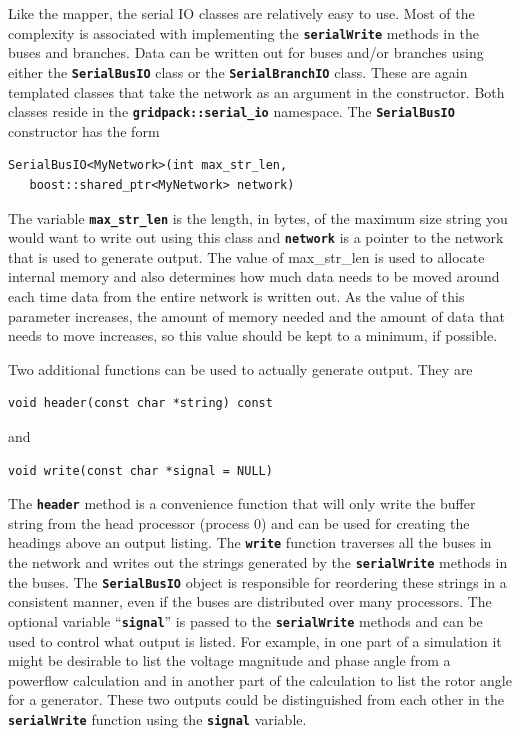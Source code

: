 Like the mapper, the serial IO classes are relatively easy to use. Most of the complexity is associated with implementing the \texttt{\textbf{serialWrite}} methods in the buses and branches. Data can be written out for buses and/or branches using either the \texttt{\textbf{SerialBusIO}} class or the \texttt{\textbf{SerialBranchIO}} class. These are again templated classes that take the network as an argument in the constructor. Both classes reside in the \texttt{\textbf{gridpack::serial\_io}} namespace. The \texttt{\textbf{SerialBusIO}} constructor has the form

{
\color{red}
\begin{Verbatim}[fontseries=b]
SerialBusIO<MyNetwork>(int max_str_len,
   boost::shared_ptr<MyNetwork> network)
\end{Verbatim}
}

The variable \texttt{\textbf{max\_str\_len}} is the length, in bytes, of the maximum size string you would want to write out using this class and \texttt{\textbf{network}} is a pointer to the network that is used to generate output. The value of max\_str\_len is used to allocate internal memory and also determines how much data needs to be moved around each time data from the entire network is written out. As the value of this parameter increases, the amount of memory needed and the amount of data that needs to move increases, so this value should be kept to a minimum, if possible. 

Two additional functions can be used to actually generate output. They are

{
\color{red}
\begin{Verbatim}[fontseries=b]
void header(const char *string) const
\end{Verbatim}
}

and 

{
\color{red}
\begin{Verbatim}[fontseries=b]
void write(const char *signal = NULL)
\end{Verbatim}
}

The \texttt{\textbf{header}} method is a convenience function that will only write the buffer string from the head processor (process 0) and can be used for creating the headings above an output listing. The \texttt{\textbf{write}} function traverses all the buses in the network and writes out the strings generated by the \texttt{\textbf{serialWrite}} methods in the buses. The \texttt{\textbf{SerialBusIO}} object is responsible for reordering these strings in a consistent manner, even if the buses are distributed over many processors. The optional variable ``\texttt{\textbf{signal}}'' is passed to the \texttt{\textbf{serialWrite}} methods and can be used to control what output is listed. For example, in one part of a simulation it might be desirable to list the voltage magnitude and phase angle from a powerflow calculation and in another part of the calculation to list the rotor angle for a generator. These two outputs could be distinguished from each other in the \texttt{\textbf{serialWrite}} function using the \texttt{\textbf{signal}} variable.

